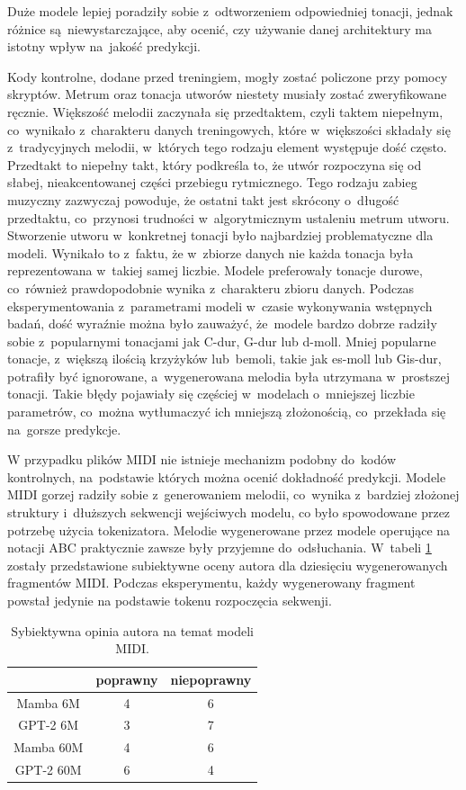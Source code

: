 \documentclass[data-science]{agh-wi} %
\begin{document}
Duże modele lepiej poradziły sobie z~odtworzeniem odpowiedniej tonacji, jednak różnice są~niewystarczające, aby ocenić, czy używanie danej architektury ma istotny wpływ na~jakość predykcji.

Kody kontrolne, dodane przed treningiem, mogły zostać policzone przy pomocy skryptów. Metrum oraz tonacja utworów niestety musiały zostać zweryfikowane ręcznie. Większość melodii zaczynała się przedtaktem, czyli taktem niepełnym, co~wynikało z~charakteru danych treningowych, które w~większości składały się z~tradycyjnych melodii, w~których tego rodzaju element występuje dość często. Przedtakt to niepełny takt, który podkreśla to, że utwór rozpoczyna się od słabej, nieakcentowanej części przebiegu rytmicznego. Tego rodzaju zabieg muzyczny zazwyczaj powoduje, że ostatni takt jest skrócony o~długość przedtaktu, co~przynosi trudności w~algorytmicznym ustaleniu metrum utworu. Stworzenie utworu w~konkretnej tonacji było najbardziej problematyczne dla modeli. Wynikało to z~faktu, że w~zbiorze danych nie każda tonacja była reprezentowana w~takiej samej liczbie. Modele preferowały tonacje durowe, co~również prawdopodobnie wynika z~charakteru zbioru danych. Podczas eksperymentowania z~parametrami modeli w~czasie wykonywania wstępnych badań, dość wyraźnie można było zauważyć, że~modele bardzo dobrze radziły sobie z~popularnymi tonacjami jak C-dur, G-dur lub d-moll. Mniej popularne tonacje, z~większą ilością krzyżyków lub~bemoli, takie jak es-moll lub Gis-dur, potrafiły być ignorowane, a~wygenerowana melodia była utrzymana w~prostszej tonacji. Takie błędy pojawiały się częściej w~modelach o~mniejszej liczbie parametrów, co~można wytłumaczyć ich mniejszą złożonością, co~przekłada się na~gorsze predykcje.

W przypadku plików MIDI nie istnieje mechanizm podobny do~kodów kontrolnych, na~podstawie których można ocenić dokładność predykcji. Modele MIDI gorzej radziły sobie z~generowaniem melodii, co~wynika z~bardziej złożonej struktury i~dłuższych sekwencji wejściwych modelu, co było spowodowane przez potrzebę użycia tokenizatora. Melodie wygenerowane przez modele operujące na notacji ABC praktycznie zawsze były przyjemne do~odsłuchania. W~tabeli \ref*{tab:midi_gen} zostały przedstawione subiektywne oceny autora dla dziesięciu wygenerowanych fragmentów MIDI. Podczas eksperymentu, każdy wygenerowany fragment powstał jedynie na podstawie tokenu rozpoczęcia sekwenji.

\begin{table}[ht!]
    \centering
    \begin{tabular}{|c|c|c|}
        \hline
                  & poprawny & niepoprawny \\ \hline
        Mamba 6M  & 4        & 6           \\ \hline
        GPT-2 6M  & 3        & 7           \\ \hline
        Mamba 60M & 4        & 6           \\ \hline
        GPT-2 60M & 6        & 4           \\ \hline
    \end{tabular}
    \caption{Sybiektywna opinia autora na temat modeli MIDI.}\label{tab:midi_gen}
\end{table}
\end{document}
